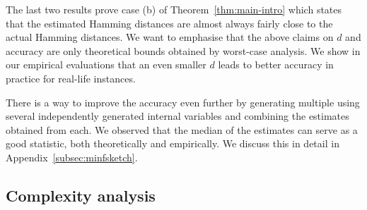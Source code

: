 



The last two results prove case (b) of Theorem~\ref{thm:main-intro} which states that the estimated Hamming distances are almost always fairly close to the actual Hamming distances. We want to emphasise that the above claims on $d$ and accuracy are only theoretical
bounds obtained by worst-case analysis. We show in our empirical evaluations
that an even smaller $d$ leads to better accuracy in practice for real-life instances.

There is a way to improve the accuracy even further by generating multiple \fsketch using several independently generated internal variables and combining the estimates obtained from each. We observed that the median of the estimates can serve as a good statistic, both theoretically and empirically. We discuss this in detail in Appendix~\ref{subsec:minfsketch}.

\subsection{Complexity analysis}\label{subsec:complexity}

